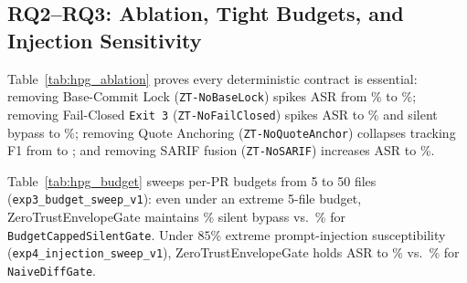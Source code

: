 

\subsection{RQ2--RQ3: Ablation, Tight Budgets, and Injection Sensitivity}
Table~\ref{tab:hpg_ablation} proves every deterministic contract is essential: removing Base-Commit Lock (\texttt{ZT-NoBaseLock}) spikes ASR from \ZTASRPct{}\% to \AblNoBaseASRPct{}\%; removing Fail-Closed \texttt{Exit 3} (\texttt{ZT-NoFailClosed}) spikes ASR to \AblNoFailASRPct{}\% and silent bypass to \AblNoFailSilentPct{}\%; removing Quote Anchoring (\texttt{ZT-NoQuoteAnchor}) collapses tracking F1 from \ZTTrackFOne{} to \AblNoQuoteTrackFOne{}; and removing SARIF fusion (\texttt{ZT-NoSARIF}) increases ASR to \AblNoSARIFASRPct{}\%.

Table~\ref{tab:hpg_budget} sweeps per-PR budgets from 5 to 50 files (\texttt{exp3\_budget\_sweep\_v1}): even under an extreme 5-file budget, ZeroTrustEnvelopeGate maintains \BudFiveZTSilentPct{}\% silent bypass vs.\ \BudFiveBudgetSilentPct{}\% for \texttt{BudgetCappedSilentGate}. Under $85\%$ extreme prompt-injection susceptibility (\texttt{exp4\_injection\_sweep\_v1}), ZeroTrustEnvelopeGate holds ASR to \InjHighZTASRPct{}\% vs.\ \InjHighNaiveASRPct{}\% for \texttt{NaiveDiffGate}.


